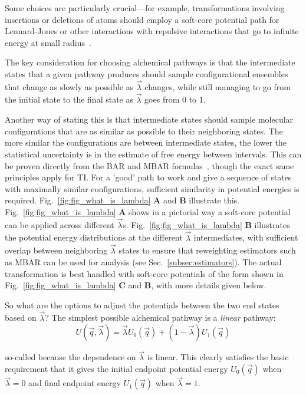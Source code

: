 \documentclass[9pt,bestpractices]{livecoms}
\begin{document}
Some choices are particularly crucial---for example, transformations involving insertions or deletions of atoms should employ a soft-core potential path for Lennard-Jones or other interactions with repulsive interactions that go to infinite energy at small radius~\cite{beutler1994avoiding, beutler1994molecular,gapsys2012new}.

The key consideration for choosing alchemical pathways is that the intermediate states that a given pathway produces should sample configurational ensembles that change as slowly as possible as $\vec{\lambda}$ changes, while still managing to go from the initial state to the final state as $\vec{\lambda}$ goes from 0 to 1.

Another way of stating this is that intermediate states should sample molecular configurations that are as similar as possible to their neighboring states. The more similar the configurations are between intermediate states, the lower the statistical uncertainty is in the estimate of free energy between intervals. This can be proven directly from the BAR and MBAR formulas~\cite{bennett1976efficient,klimovich2015guidelines}, though the exact same principles apply for TI. For a 'good' path to work and give a sequence of states with maximally similar configurations, sufficient similarity in potential energies is required. Fig.~\ref{fig:fig_what_is_lambda} \textbf{A} and \textbf{B} illustrate this. Fig.~\ref{fig:fig_what_is_lambda} \textbf{A} shows in a pictorial way a soft-core potential can be applied across different $\vec{\lambda}$s. Fig.~\ref{fig:fig_what_is_lambda} \textbf{B} illustrates the potential energy distributions at the different $\vec{\lambda}$ intermediates, with sufficient overlap between neighboring $\vec{\lambda}$ states to ensure that reweighting estimators such as MBAR can be used for analysis (see Sec.~\ref{subsec:estimators}). The actual transformation is best handled with soft-core potentials of the form shown in Fig.~\ref{fig:fig_what_is_lambda} \textbf{C} and \textbf{B}, with more details given below. 

So what are the options to adjust the potentials between the two end states based on $\vec{\lambda}$? The simplest possible alchemical pathway is a \textit{linear} pathway:
\begin{equation}
U(\vec{q},\vec{\lambda}) = \vec{\lambda} U_0(\vec{q}) + (1-\vec{\lambda})U_1(\vec{q}) \end{equation}

so-called because the dependence on $\vec{\lambda}$ is linear. This clearly satisfies the basic requirement that it gives the initial endpoint potential energy $U_0(\vec{q})$ when $\vec{\lambda}=0$ and final endpoint energy $U_1(\vec{q})$ when $\vec{\lambda}=1$. 
\end{document}
